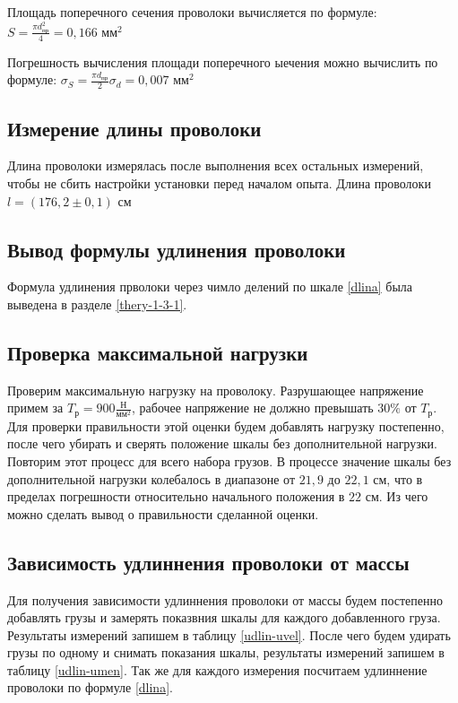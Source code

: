 \documentclass[a4paper,12pt]{article}
\begin{document}
Площадь поперечного сечения проволоки вычисляется по формуле: $S = \frac{\pi d_\text{пр}^2}{4} = 0,166 \text{ мм}^2$

Погрешность вычисления площади поперечного ыечения можно вычислить по формуле: $\sigma_S = \frac{\pi d_\text{пр}}{2} \sigma_d = 0,007 \text{ мм}^2$

\subsection{Измерение длины проволоки}

Длина проволоки измерялась после выполнения всех остальных измерений, чтобы не сбить настройки установки перед началом опыта. Длина проволоки $l = (176,2 \pm 0,1) \text{ см}$

\subsection{Вывод формулы удлинения проволоки}

Формула удлинения прволоки через чимло делений по шкале \eqref{dlina} была выведена в разделе \ref{thery-1-3-1}.

\subsection{Проверка максимальной нагрузки}

Проверим максимальную нагрузку на проволоку. Разрушающее напряжение примем за $T_\text{р} = 900 \frac{\text{Н}}{\text{мм}^2}$, рабочее напряжение не должно превышать $30 \%$ от $T_\text{р}$. Для проверки правильности этой оценки будем добавлять нагрузку постепенно, после чего убирать и сверять положение шкалы без дополнительной нагрузки. Повторим этот процесс для всего набора грузов. В процессе значение шкалы без дополнительной нагрузки колебалось в диапазоне от $21,9$ до $22,1$ см, что в пределах погрешности относительно начального положения в $22$ см. Из чего можно сделать вывод о правильности сделанной оценки.

\subsection{Зависимость удлиннения проволоки от массы}

Для получения зависимости удлиннения проволоки от массы будем постепенно добавлять грузы и замерять показвния шкалы для каждого добавленного груза. Результаты измерений запишем в таблицу \ref{udlin-uvel}. После чего будем удирать грузы по одному и снимать показания шкалы, результаты измерений запишем в таблицу \ref{udlin-umen}. Так же для каждого измерения посчитаем удлиннение проволоки по формуле \eqref{dlina}.
\end{document}
